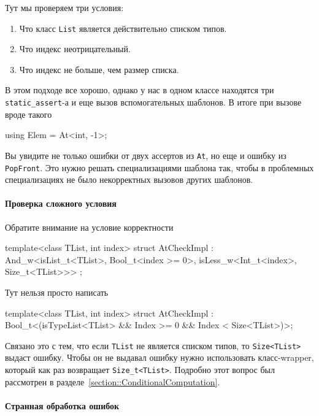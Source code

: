 Тут мы проверяем три условия:
\begin{enumerate}
\item Что класс \verb"List" является действительно списком типов.

\item Что индекс неотрицательный.

\item Что индекс не больше, чем размер списка.
\end{enumerate}
В этом подходе все хорошо, однако у нас в одном классе находятся три \verb"static_assert"-а и еще вызов вспомогательных шаблонов.
В итоге при вызове вроде такого
\begin{cppcode}
using Elem = At<int, -1>;
\end{cppcode}
Вы увидите не только ошибки от двух ассертов из \verb"At", но еще и ошибку из \verb"PopFront".
Это нужно решать специализациями шаблона так, чтобы в проблемных специализациях не было некорректных вызовов других шаблонов.

\paragraph{Проверка сложного условия}

Обратите внимание на условие корректности
\begin{cppcode}
template<class TList, int index>
struct AtCheckImpl : And_w<isList_t<TList>, Bool_t<index >= 0>,
                           isLess_w<Int_t<index>, Size_t<TList>>> {};
\end{cppcode}
Тут нельзя просто написать
\begin{cppcode}
template<class TList, int index>
struct AtCheckImpl : Bool_t<(isTypeList<TList> && Index >= 0 && Index < Size<TList>)>;
\end{cppcode}
Связано это с тем, что если \verb"TList" не является списком типов, то \verb"Size<TList>" выдаст ошибку.
Чтобы он не выдавал ошибку нужно использовать класс-wrapper, который как раз возвращает \verb"Size_t<TList>".
Подробно этот вопрос был рассмотрен в разделе~\ref{section::ConditionalComputation}.

\paragraph{Странная обработка ошибок}

